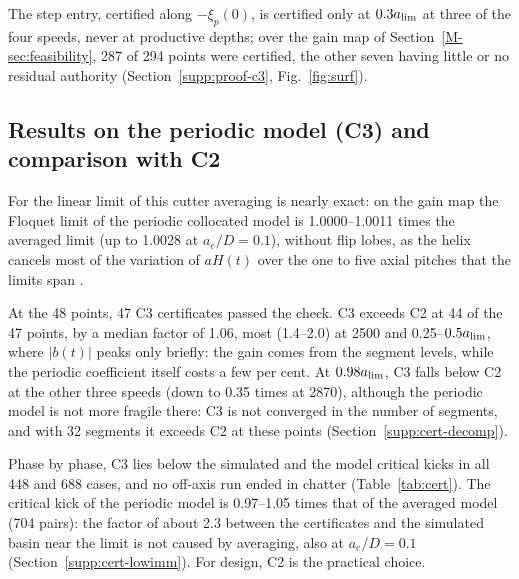 The step entry, certified along $-\xi_p(0)$, is certified only at $0.3a_{\lim}$ at three of the four speeds, never at productive depths; over the gain map of Section~\ref{M-sec:feasibility}, 287 of 294 points were certified, the other seven having little or no residual authority (Section~\ref{supp:proof-c3}, Fig.~\ref{fig:surf}).

\subsection{Results on the periodic model (C3) and comparison with C2}\label{supp:std-c3}

For the linear limit of this cutter averaging is nearly exact: on the gain map the Floquet limit of the periodic collocated model is 1.0000--1.0011 times the averaged limit (up to 1.0028 at $a_e/D=0.1$), without flip lobes, as the helix cancels most of the variation of $aH(t)$ over the one to five axial pitches that the limits span \citep{insperger2006helix,zatarain2006helix}.

At the 48 points, 47 C3 certificates passed the check. C3 exceeds C2 at 44 of the 47 points, by a median factor of 1.06, most (1.4--2.0) at \SI{2500}{\rpm} and 0.25--$0.5a_{\lim}$, where $\lvert b(t)\rvert$ peaks only briefly: the gain comes from the segment levels, while the periodic coefficient itself costs a few per cent. At $0.98a_{\lim}$, C3 falls below C2 at the other three speeds (down to 0.35 times at \SI{2870}{\rpm}), although the periodic model is not more fragile there: C3 is not converged in the number of segments, and with 32 segments it exceeds C2 at these points (Section~\ref{supp:cert-decomp}).

Phase by phase, C3 lies below the simulated and the model critical kicks in all 448 and 688 cases, and no off-axis run ended in chatter (Table~\ref{tab:cert}). The critical kick of the periodic model is 0.97--1.05 times that of the averaged model (704 pairs): the factor of about 2.3 between the certificates and the simulated basin near the limit is not caused by averaging, also at $a_e/D=0.1$ (Section~\ref{supp:cert-lowimm}). For design, C2 is the practical choice.

